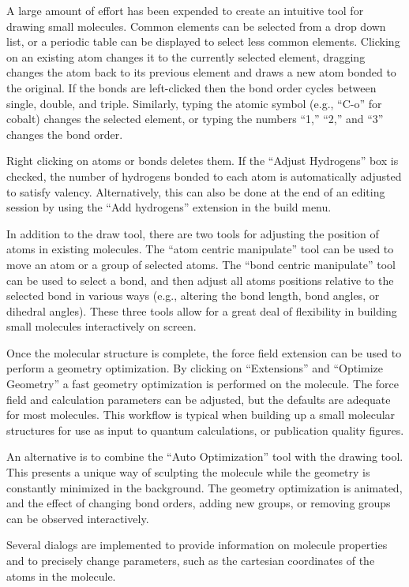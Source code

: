 \documentclass[10pt]{bmc_article}
\newenvironment{bmcformat}{\begin{raggedright}
\baselineskip20pt\sloppy\setboolean{publ}{false}}{\end{raggedright}
\baselineskip20pt\sloppy}
\begin{document}
\begin{bmcformat}
A large amount of effort has been expended to create an intuitive tool for
drawing small molecules. Common elements can be selected from a drop down list,
or a periodic table can be displayed to select less common elements. Clicking on
an existing atom changes it to the currently selected element,
dragging changes the atom back to its previous element and draws
a new atom bonded to the original. If the bonds are left-clicked then the bond
order cycles between single, double, and triple. Similarly, typing the
atomic symbol (e.g., ``C-o'' for cobalt) changes the selected element,
or typing the numbers ``1,'' ``2,'' and ``3'' changes the bond order.

Right clicking on atoms or bonds deletes them. If the ``Adjust Hydrogens'' box
is checked, the number of hydrogens bonded to each atom is automatically
adjusted to satisfy valency. Alternatively, this can also be done at the end of
an editing session by using the ``Add hydrogens'' extension in the build menu.

In addition to the draw tool, there are two tools for adjusting the position of
atoms in existing molecules. The ``atom centric manipulate'' tool can be used to
move an atom or a group of selected atoms. The ``bond centric manipulate'' tool
can
be used to select a bond, and then adjust all atoms positions relative to the
selected bond in various ways (e.g., altering the bond length, bond
angles, or dihedral angles). These three tools allow for a great deal of
flexibility in building small molecules interactively on screen.

Once the molecular structure is complete, the force field extension can be used to
perform a geometry optimization. By clicking on ``Extensions'' and ``Optimize
Geometry'' a fast geometry optimization is performed on the molecule. The
force field and calculation parameters can be adjusted, but the defaults are
adequate for most molecules. This workflow is typical when building up a small
molecular structures for use as input to quantum calculations, or publication
quality figures.

An alternative is to combine the ``Auto Optimization'' tool with the drawing
tool. This presents a unique way of sculpting the molecule while the geometry is
constantly minimized in the background. The geometry optimization is animated,
and the effect of changing bond orders, adding new groups, or removing groups can
be observed interactively.

Several dialogs are implemented to provide information on molecule properties
and to precisely change parameters, such as the cartesian coordinates of the atoms
in the molecule.


\end{bmcformat}
\end{document}
